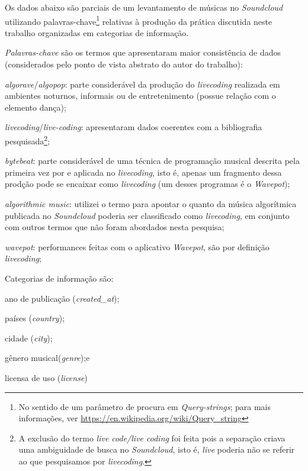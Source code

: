 Os dados abaixo são parciais de um levantamento de músicas no \textit{Soundcloud} utilizando palavras-chave\footnote{No sentido de um parâmetro de procura em \emph{Query-strings}; para mais informações, ver \url{https://en.wikipedia.org/wiki/Query_string}} relativas à produção da prática discutida neste trabalho organizadas em categorias de informação.

\emph{Palavras-chave} são os termos que apresentaram maior consistência de dados (considerados pelo ponto de vista abstrato do autor do trabalho): \begin{inparaenum}
\item \emph{algorave}/\emph{algopop}: parte considerável da produção do \emph{livecoding} realizada em ambientes noturnos, informais ou de entretenimento (possue relação com o elemento dança);
\item \emph{livecoding}/\emph{live-coding}: apresentaram dados coerentes com a bibliografia pesquisada\footnote{A exclusão do termo \emph{live code/live coding} foi feita pois a separação criava uma ambiguidade de busca no \emph{Soundcloud}, isto é, \emph{live} poderia não se referir ao que pesquisamos por \emph{livecoding}.};
\item \emph{bytebeat}: parte considerável de uma técnica de programação musical descrita pela primeira vez por  e aplicada no \emph{livecoding}, isto é, apenas um fragmento dessa prodção pode se encaixar como \emph{livecoding} (um desses programas é o \emph{Wavepot});
\item \emph{algorithmic music}: utilizei o termo para apontar o quanto da música algorítmica publicada no \emph{Soundcloud} poderia ser classificado como \emph{livecoding}, em conjunto com outros termos que não foram abordados nesta pesquisa;
\item \emph{wavepot}: performances feitas com o aplicativo \emph{Wavepot}, são por definição \emph{livecoding};
\end{inparaenum}

Categorias de informação são:\begin{inparaenum}
\item ano de publicação (\emph{created\_at});
\item países (\emph{country});
\item cidade (\emph{city});
\item gênero musical(\emph{genre});e 
\item licensa de uso (\emph{license})
\end{inparaenum}

